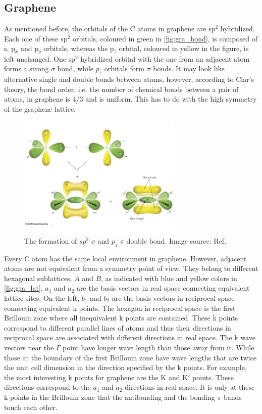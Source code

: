 \subsection{Graphene}

As mentioned before, the orbitals of the C atoms in graphene are sp$^2$ hybridized. Each one of these sp$^2$ orbitals, coloured in green in \autoref{fig:gra_bond}, is composed of s, p$_x$ and p$_y$ orbitals, whereas the p$_z$ orbital, coloured in yellow in the figure, is left unchanged. One sp$^2$ hybridized orbital with the one from an adjacent atom forms a strong $\sigma$ bond, while $p_z$ orbitals form $\pi$ bonds. It may look like alternative single and double bonds between atoms, however, according to Clar's theory, the bond order, i.e. the number of chemical bonds between a pair of atoms, in graphene is 4/3 and is uniform\cite{Wassmann2010}. This has to do with the high symmetry of the graphene lattice.

\begin{figure}[htbp!] 
\centering  
\includegraphics[width=0.7\textwidth]{double_bond}
\caption[The formation of sp$^2$ $\sigma$ and p$_z$ $\pi$ double bond]{ The formation of $sp^2$ $\sigma$ and $p_z$ $\pi$ double bond. Image source: Ref. \cite{gra_bond} }  
\label{fig:gra_bond}
\end{figure} 

Every C atom has the same local environment in graphene. However, adjacent atoms are not equivalent from a symmetry point of view. They belong to different hexagonal sublattices, $A$ and $B$, as indicated with blue and yellow colors in \autoref{fig:gra_lat}. $a_1$ and $a_2$ are the basis vectors in real space connecting equivalent lattice sites. On the left, $b_1$ and $b_2$ are the basis vectors in reciprocal space connecting equivalent k points. The hexagon in reciprocal space is the first Brillouin zone where all inequivalent k points are contained. These k points correspond to different parallel lines of atoms and thus their directions in reciprocal space are associated with different directions in real space. The k wave vectors near the $\Gamma$ point have longer wave length than those away from it. While those at the boundary of the first Brillouin zone have wave lengths that are twice the unit cell dimension in the direction specified by the k points. For example, the most interesting k points for graphene are the $\mathrm{K}$ and $\mathrm{K}'$ points. These directions correspond to the $a_1$ and $a_2$ directions in real space. It is only at these k points in the Brillouin zone that the antibonding and the bonding $\pi$ bands touch each other.  

